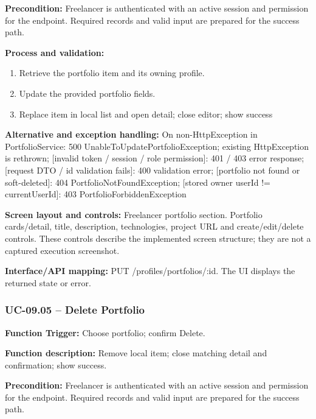 \textbf{Precondition:} Freelancer is authenticated with an active session and permission for the endpoint. Required records and valid input are prepared for the success path.

\textbf{Process and validation:}
\begin{enumerate}
\item Retrieve the portfolio item and its owning profile.
\item Update the provided portfolio fields.
\item Replace item in local list and open detail; close editor; show success
\end{enumerate}
\textbf{Alternative and exception handling:} On non-Http\allowbreak{}Exception in Portfolio\allowbreak{}Service: 500 Unable\allowbreak{}To\allowbreak{}Update\allowbreak{}Portfolio\allowbreak{}Exception; existing Http\allowbreak{}Exception is rethrown; [invalid token /\allowbreak{} session /\allowbreak{} role permission]: 401 /\allowbreak{} 403 error response; [request DTO /\allowbreak{} id validation fails]: 400 validation error; [portfolio not found or soft-deleted]: 404 Portfolio\allowbreak{}Not\allowbreak{}Found\allowbreak{}Exception; [stored owner user\allowbreak{}Id !=\allowbreak{} current\allowbreak{}User\allowbreak{}Id]: 403 Portfolio\allowbreak{}Forbidden\allowbreak{}Exception

\textbf{Screen layout and controls:} Freelancer portfolio section. Portfolio cards/\allowbreak{}detail, title, description, technologies, project URL and create/\allowbreak{}edit/\allowbreak{}delete controls. These controls describe the implemented screen structure; they are not a captured execution screenshot.

\textbf{Interface/\allowbreak{}API mapping:} PUT /\allowbreak{}profiles/\allowbreak{}portfolios/\allowbreak{}:id. The UI displays the returned state or error.

\subsubsection{UC-09.05 -- Delete Portfolio}
\textbf{Function Trigger:} Choose portfolio; confirm Delete.

\textbf{Function description:} Remove local item; close matching detail and confirmation; show success.

\textbf{Precondition:} Freelancer is authenticated with an active session and permission for the endpoint. Required records and valid input are prepared for the success path.

